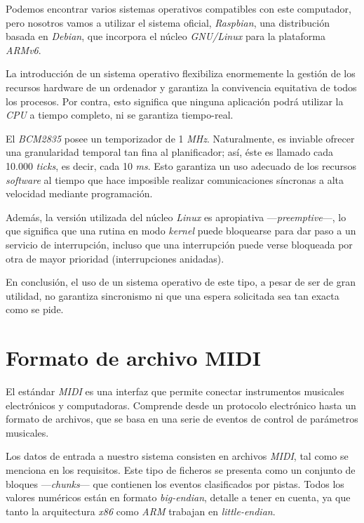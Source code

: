 Podemos encontrar varios sistemas operativos compatibles con este computador, pero nosotros vamos a utilizar el sistema oficial, \textit{Raspbian}, una distribución basada en \textit{Debian}, que incorpora el núcleo \textit{GNU/Linux} para la plataforma \textit{ARMv6}.

La introducción de un sistema operativo flexibiliza enormemente la gestión de los recursos hardware de un ordenador y garantiza la convivencia equitativa de todos los procesos. Por contra, esto significa que ninguna aplicación podrá utilizar la \textit{CPU} a tiempo completo, ni se garantiza tiempo-real.

El \textit{BCM2835} posee un temporizador de 1 \textit{MHz}. Naturalmente, es inviable ofrecer una granularidad temporal tan fina al planificador; así, éste es llamado cada 10.000 \textit{ticks}, es decir, cada 10 \textit{ms}. Esto garantiza un uso adecuado de los recursos \textit{software} al tiempo que hace imposible realizar comunicaciones síncronas a alta velocidad mediante programación.

Además, la versión utilizada del núcleo \textit{Linux} es apropiativa ---\textit{preemptive}---, lo que significa que una rutina en modo \textit{kernel} puede bloquearse para dar paso a un servicio de interrupción, incluso que una interrupción puede verse bloqueada por otra de mayor prioridad (interrupciones anidadas).

En conclusión, el uso de un sistema operativo de este tipo, a pesar de ser de gran utilidad, no garantiza sincronismo ni que una espera solicitada sea tan exacta como se pide.

\section{Formato de archivo MIDI}

El estándar \textit{MIDI} es una interfaz que permite conectar instrumentos musicales electrónicos y computadoras. Comprende desde un protocolo electrónico hasta un formato de archivos, que se basa en una serie de eventos de control de parámetros musicales. \cite{wiki_midi}

Los datos de entrada a nuestro sistema consisten en archivos \textit{MIDI}, tal como se menciona en los requisitos. Este tipo de ficheros se presenta como un conjunto de bloques ---\textit{chunks}--- que contienen los eventos clasificados por pistas. Todos los valores numéricos están en formato \textit{big-endian}, detalle a tener en cuenta, ya que tanto la arquitectura \textit{x86} como \textit{ARM} trabajan en \textit{little-endian}. \cite{midi}

